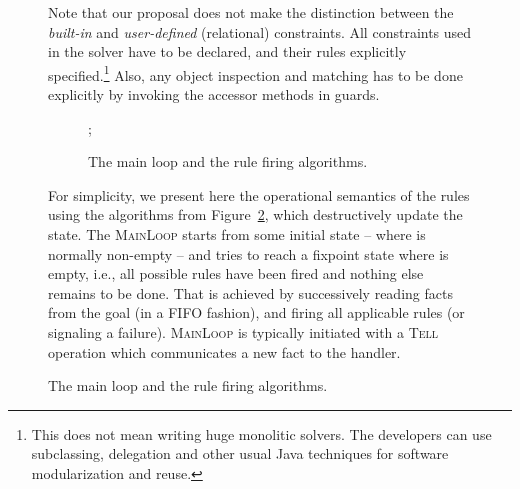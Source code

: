\documentclass[runningheads,a4paper,11pt,dvipsname]{llncs}
\begin{document}
\begin{figure}[tb]
\begin{minipage}[t]{0.75\textwidth}
\begin{tabbing}
Note that our proposal does not make the distinction between the
\emph{built-in} and \emph{user-defined} (relational) constraints.  All
constraints used in the solver have to be declared, and their rules
explicitly specified.\footnote{This does not mean writing huge monolitic solvers.  The
  developers can use subclassing, delegation and other usual Java
  techniques for software modularization and reuse.}
Also, any object inspection and matching has to be done explicitly by
invoking the accessor methods in guards.

\begin{figure}[tb]
  \begin{minipage}[t]{0.40\linewidth}
    \begin{algorithmic}[1]
       \State  \While{}
      \State ;  \If{} \State  \Else \State
       \If{} \State 
      \EndIf
      \EndIf
      \EndWhile
      \State\Return{}
      \EndFunction
      \State
        \State {}
      \EndFunction
    \end{algorithmic}
  \end{minipage}\begin{minipage}[t]{0.58\linewidth}
    \begin{algorithmic}[1]
       \State \For{} 
        \State  \State 
\ForAll{}  \State 
       \State 
      \EndIf
      \EndFor
      \If{} 
        \State  \State\Return{}
      \EndIf
      \EndFor
      \State 
\EndProcedure
    \end{algorithmic}
  \end{minipage}
  \caption{The main loop and the rule firing algorithms.}
  \label{fig:main-loop}
\end{figure}

For simplicity, we present here the operational semantics of the rules
using the algorithms from Figure~\ref{fig:main-loop}, which
destructively update the state.  The \textsc{MainLoop} starts from
some initial state  -- where  is normally non-empty -- and
tries to reach a fixpoint state  where  is empty, i.e.,
all possible rules have been fired and nothing else remains to be
done.  That is achieved by successively reading facts from the goal
(in a FIFO fashion), and firing all applicable rules (or signaling a
failure).  \textsc{MainLoop} is typically initiated with a
\textsc{Tell} operation which communicates a new fact to the handler.


\end{tabbing}
\end{minipage}
\end{figure}
\end{document}
